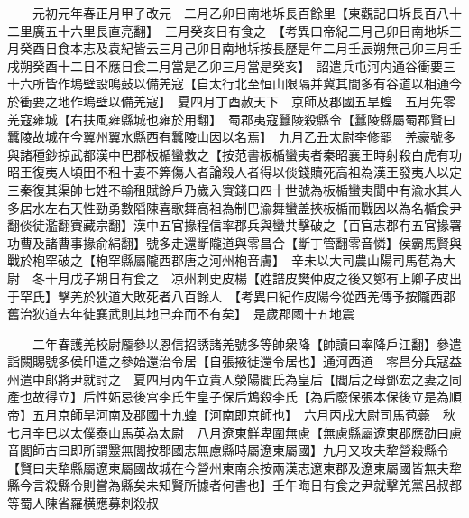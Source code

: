 　　元初元年春正月甲子改元　二月乙卯日南地坼長百餘里【東觀記曰坼長百八十二里廣五十六里長直亮翻】　三月癸亥日有食之　【考異曰帝紀二月己卯日南地坼三月癸酉日食本志及袁紀皆云三月己卯日南地坼按長歷是年二月壬辰朔無己卯三月壬戌朔癸酉十二日不應日食二月當是乙卯三月當是癸亥】　詔遣兵屯河内通谷衝要三十六所皆作塢壁設鳴鼔以備羌寇【自太行北至恒山限隔并冀其間多有谷道以相通今於衝要之地作塢壁以備羌寇】　夏四月丁酉赦天下　京師及郡國五旱蝗　五月先零羌寇雍城【右扶風雍縣城也雍於用翻】　蜀郡夷寇蠶陵殺縣令【蠶陵縣屬蜀郡賢曰蠶陵故城在今翼州翼水縣西有蠶陵山因以名焉】　九月乙丑太尉李修罷　羌豪號多與諸種鈔掠武都漢中巴郡板楯蠻救之【按范書板楯蠻夷者秦昭襄王時射殺白虎有功昭王復夷人頃田不租十妻不筭傷人者論殺人者得以倓錢贖死高祖為漢王發夷人以定三秦復其渠帥七姓不輸租賦餘戶乃歲入賨錢口四十世號為板楯蠻夷閬中有渝水其人多居水左右天性勁勇數䧟陳喜歌舞高祖為制巴渝舞蠻盖挾板楯而戰因以為名楯食尹翻倓徒濫翻賨藏宗翻】漢中五官掾程信率郡兵與蠻共擊破之【百官志郡冇五官掾署功曹及諸曹事掾俞絹翻】號多走還斷隴道與零昌合【斷丁管翻零音憐】侯霸馬賢與戰於枹罕破之【枹罕縣屬隴西郡唐之河州枹音膚】　辛未以大司農山陽司馬苞為大尉　冬十月戊子朔日有食之　凉州刺史皮楊【姓譜皮樊仲皮之後又鄭有上卿子皮出于罕氏】擊羌於狄道大敗死者八百餘人　【考異曰紀作皮陽今從西羌傳予按隴西郡舊治狄道去年徒襄武則其地已弃而不有矣】　是歲郡國十五地震

　　二年春護羌校尉龎參以恩信招誘諸羌號多等帥衆降【帥讀曰率降戶江翻】參遣詣闕賜號多侯印遣之參始還治令居【自張掖徙還令居也】通河西道　零昌分兵寇益州遣中郎將尹就討之　夏四月丙午立貴人滎陽閻氏為皇后【閻后之母鄧宏之妻之同產也故得立】后性妬忌後宫李氏生皇子保后鴆殺李氏【為后廢保張本保後立是為順帝】五月京師旱河南及郡國十九蝗【河南即京師也】　六月丙戌大尉司馬苞薨　秋七月辛巳以太僕泰山馬英為太尉　八月遼東鮮卑圍無慮【無慮縣屬遼東郡應劭曰慮音閭師古曰即所謂毉無閭按郡國志無慮縣時屬遼東屬國】九月又攻夫犂營殺縣令【賢曰夫犂縣屬遼東屬國故城在今營州東南余按兩漢志遼東郡及遼東屬國皆無夫犂縣今言殺縣令則嘗為縣矣未知賢所據者何書也】壬午晦日有食之尹就擊羌黨呂叔都等蜀人陳省羅横應募刺殺叔


